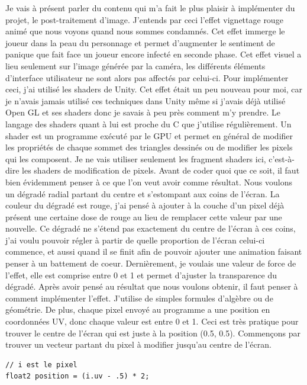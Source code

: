 \documentclass{article}
\begin{document}
Je vais à présent parler du contenu qui m'a fait le plus plaisir à implémenter du projet, le post-traitement d'image. J'entends par ceci l'effet vignettage rouge animé que nous voyons quand nous sommes condamnés. Cet effet immerge le joueur dans la peau du personnage et permet d'augmenter le sentiment de panique que fait face un joueur encore infecté en seconde phase. Cet effet visuel a lieu seulement sur l'image générée par la caméra, les différents éléments d'interface utilisateur ne sont alors pas affectés par celui-ci.
Pour implémenter ceci, j'ai utilisé les shaders de Unity. Cet effet était un peu nouveau pour moi, car je n'avais jamais utilisé ces techniques dans Unity même si j'avais déjà utilisé Open GL et ses shaders donc je savais à peu près comment m'y prendre. Le langage des shaders quant à lui est proche du C que j'utilise régulièrement. Un shader est un programme exécuté par le GPU et permet en général de modifier les propriétés de chaque sommet des triangles dessinés ou de modifier les pixels qui les composent. Je ne vais utiliser seulement les fragment shaders ici, c'est-à-dire les shaders de modification de pixels.
Avant de coder quoi que ce soit, il faut bien évidemment penser à ce que l'on veut avoir comme résultat.
Nous voulons un dégradé radial partant du centre et s'estompant aux coins de l'écran. La couleur du dégradé est rouge, j'ai pensé à ajouter à la couche d'un pixel déjà présent une certaine dose de rouge au lieu de remplacer cette valeur par une nouvelle. Ce dégradé ne s'étend pas exactement du centre de l'écran à ces coins, j'ai voulu pouvoir régler à partir de quelle proportion de l'écran celui-ci commence, et aussi quand il se finit afin de pouvoir ajouter une animation faisant penser à un battement de coeur. Dernièrement, je voulais une valeur de force de l'effet, elle est comprise entre 0 et 1 et permet d'ajuster la transparence du dégradé.
Après avoir pensé au résultat que nous voulons obtenir, il faut penser à comment implémenter l'effet. J'utilise de simples formules d'algèbre ou de géométrie. De plus, chaque pixel envoyé au programme a une position en coordonnées UV, donc chaque valeur est entre 0 et 1. Ceci est très pratique pour trouver le centre de l'écran qui est juste à la position (0.5, 0.5).
Commençons par trouver un vecteur partant du pixel à modifier jusqu'au centre de l'écran.


\begin{lstlisting}
// i est le pixel
float2 position = (i.uv - .5) * 2;
\end{lstlisting}
\end{document}
